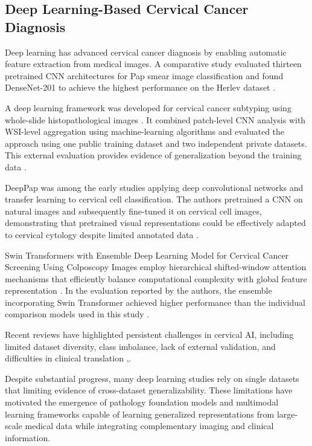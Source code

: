 \documentclass{article}
\begin{document}
\subsection{Deep Learning-Based Cervical Cancer Diagnosis}

 Deep learning has advanced cervical cancer diagnosis by enabling automatic feature extraction from medical images. A comparative study evaluated thirteen pretrained CNN architectures for Pap smear image classification and found DenseNet-201 to achieve the highest performance on the Herlev dataset \cite{tan2024cervical}. 

A deep learning framework was developed for cervical cancer subtyping using whole-slide histopathological images \cite{yan2025deep}. It combined patch-level CNN analysis with WSI-level aggregation using machine-learning algorithms and evaluated the approach using one public training dataset and two independent private datasets. This external evaluation provides evidence of generalization beyond the training data \cite{yan2025deep}.

DeepPap was among the early studies applying deep convolutional networks and transfer learning to cervical cell classification. The authors pretrained a CNN on natural images and subsequently fine-tuned it on cervical cell images, demonstrating that pretrained visual representations could be effectively adapted to cervical cytology despite limited annotated data \cite{zhang2017deeppap}.

Swin Transformers with Ensemble Deep Learning Model for Cervical Cancer Screening Using Colposcopy Images employ hierarchical shifted-window attention mechanisms that efficiently balance computational complexity with global feature representation \cite{himabindu2025swin}. In the evaluation reported by the authors, the ensemble incorporating Swin Transformer achieved higher performance than the individual comparison models used in this study \cite{himabindu2025swin}. 

Recent reviews have highlighted persistent challenges in cervical AI, including limited dataset diversity, class imbalance, lack of external validation, and difficulties in clinical translation \cite{vallescoral2026review},\cite{youneszade2023deep}. 

Despite substantial progress, many deep learning studies rely on single datasets that limiting evidence of cross-dataset generalizability. These limitations have motivated the emergence of pathology foundation models and multimodal learning frameworks capable of learning generalized representations from large-scale medical data while integrating complementary imaging and clinical information. 
\end{document}

